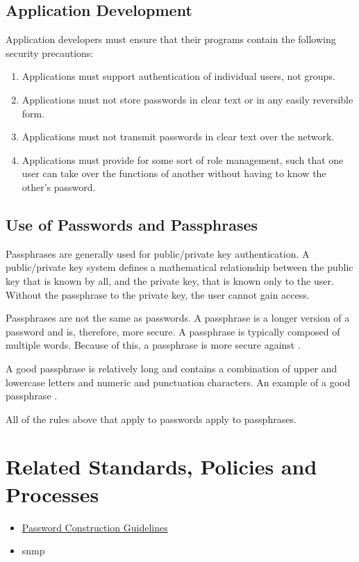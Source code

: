 \subsection{Application Development}
Application developers must ensure that their programs contain the following security precautions:
\begin{enumerate}
\item
Applications must support authentication of individual users, not groups.
\item
Applications must not store passwords in clear text or in any easily reversible form.
\item
Applications must not transmit passwords in clear text over the network.
\item
Applications must provide for some sort of role management, such that one user can take over the functions of another without having to know the other's password.
\end{enumerate}
\subsection{Use of Passwords and Passphrases}
Passphrases are generally used for public/private key authentication.  
A public/private key system defines a mathematical relationship between the public key that is known by all, and the private key, that is known only to the user.  
Without the passphrase to  the private key, the user cannot gain access.

Passphrases are not the same as passwords.  
A passphrase is a longer version of a password and is, therefore, more secure.  
A passphrase is typically composed of multiple words.  
Because of this, a passphrase is more secure against .

A good passphrase is relatively long and contains a combination of upper and lowercase letters and numeric and punctuation characters.  
An example of a good passphrase .

All of the rules above that apply to passwords apply to passphrases.
\CommonPolicyCompliance

\section{Related Standards, Policies\oxford{} and Processes}
\begin{itemize}
\item \hyperref[G:PCG]{Password Construction Guidelines}
\end{itemize}
\CommonDefinitionsAndTerms
\begin{itemize}
\item \acrfull{snmp}
\end{itemize}
\CommonRevisionHistory
